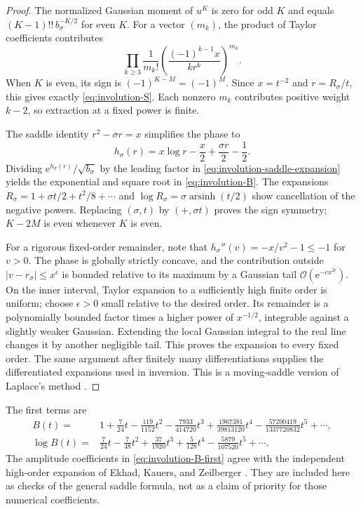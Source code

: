 \documentclass[11pt,a4paper]{article}
\numberwithin{equation}{section}
\theoremstyle{definition}
\theoremstyle{remark}
\newcommand{\ee}{\mathrm e}
\newcommand{\bigO}{\mathcal O}
\begin{document}
\begin{proof}
The normalized Gaussian moment of $u^K$ is zero for odd $K$ and equals $(K-1)!!\,b_\sigma^{-K/2}$ for even $K$. For a vector $(m_k)$, the product of Taylor coefficients contributes
\[
 \prod_{k\ge3}\frac1{m_k!}
       \left(\frac{(-1)^{k-1}x}{kr^k}\right)^{m_k}.
\]
When $K$ is even, its sign is $(-1)^{K-M}=(-1)^M$. Since $x=t^{-2}$ and $r=R_\sigma/t$, this gives exactly \eqref{eq:involution-S}. Each nonzero $m_k$ contributes positive weight $k-2$, so extraction at a fixed power is finite.

The saddle identity $r^2-\sigma r=x$ simplifies the phase to
\[
 h_\sigma(r)=x\log r-\frac x2+\frac{\sigma r}{2}-\frac12.
\]
Dividing $\ee^{h_\sigma(r)}/\sqrt{b_\sigma}$ by the leading factor in \eqref{eq:involution-saddle-expansion} yields the exponential and square root in \eqref{eq:involution-B}. The expansions $R_\sigma=1+\sigma t/2+t^2/8+\cdots$ and $\log R_\sigma=\sigma\operatorname{arsinh}(t/2)$ show cancellation of the negative powers. Replacing $(\sigma,t)$ by $(+,\sigma t)$ proves the sign symmetry; $K-2M$ is even whenever $K$ is even.

For a rigorous fixed-order remainder, note that
$h_\sigma''(v)=-x/v^2-1\le-1$ for $v>0$. The phase is globally strictly concave, and the contribution outside $|v-r_\sigma|\le x^\epsilon$ is bounded relative to its maximum by a Gaussian tail $\bigO(\ee^{-c x^{2\epsilon}})$. On the inner interval, Taylor expansion to a sufficiently high finite order is uniform; choose $\epsilon>0$ small relative to the desired order. Its remainder is a polynomially bounded factor times a higher power of $x^{-1/2}$, integrable against a slightly weaker Gaussian. Extending the local Gaussian integral to the real line changes it by another negligible tail. This proves the expansion to every fixed order. The same argument after finitely many differentiations supplies the differentiated expansions used in inversion. This is a moving-saddle version of Laplace's method \cite{dlmflaplace}.
\end{proof}

The first terms are
\begin{align}
 B(t)={}&1+\frac7{24}t-\frac{119}{1152}t^2
       -\frac{7933}{414720}t^3
       +\frac{1967381}{39813120}t^4
       -\frac{57200419}{1337720832}t^5+\cdots,
 \label{eq:involution-B-first}\\
 \log B(t)={}&\frac7{24}t-\frac7{48}t^2
      +\frac{37}{1920}t^3+\frac5{128}t^4
      -\frac{5879}{107520}t^5+\cdots.
 \label{eq:involution-logB}
\end{align}
The amplitude coefficients in \eqref{eq:involution-B-first} agree with the independent high-order expansion of Ekhad, Kauers, and Zeilberger \cite{ekz}. They are included here as checks of the general saddle formula, not as a claim of priority for those numerical coefficients.
\end{document}

